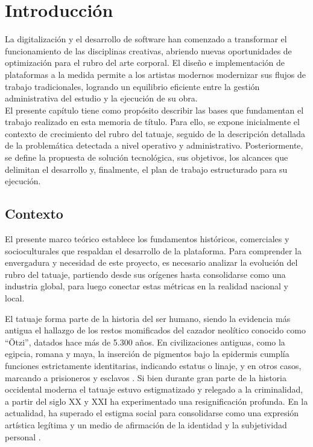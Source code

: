 \chapter{Introducción}

La digitalización y el desarrollo de software han comenzado a transformar el funcionamiento de las disciplinas creativas, abriendo nuevas oportunidades de optimización para el rubro del arte corporal. El diseño e implementación de plataformas a la medida permite a los artistas modernos modernizar sus flujos de trabajo tradicionales, logrando un equilibrio eficiente entre la gestión administrativa del estudio y la ejecución de su obra.\\
\indent El presente capítulo tiene como propósito describir las bases que fundamentan el trabajo realizado en esta memoria de título. Para ello, se expone inicialmente el contexto de crecimiento del rubro del tatuaje, seguido de la descripción detallada de la problemática detectada a nivel operativo y administrativo. Posteriormente, se define la propuesta de solución tecnológica, sus objetivos, los alcances que delimitan el desarrollo y, finalmente, el plan de trabajo estructurado para su ejecución.

\section{Contexto}

El presente marco teórico establece los fundamentos históricos, comerciales y socioculturales que respaldan el desarrollo de la plataforma. Para comprender la envergadura y necesidad de este proyecto, es necesario analizar la evolución del rubro del tatuaje, partiendo desde sus orígenes hasta consolidarse como una industria global, para luego conectar estas métricas en la realidad nacional y local.

El tatuaje forma parte de la historia del ser humano, siendo la evidencia más antigua el hallazgo de los restos momificados del cazador neolítico conocido como ``Ötzi'', datados hace más de 5.300 años. En civilizaciones antiguas, como la egipcia, romana y maya, la inserción de pigmentos bajo la epidermis cumplía funciones estrictamente identitarias, indicando estatus o linaje, y en otros casos, marcando a prisioneros y esclavos \cite{ballen2015}. Si bien durante gran parte de la historia occidental moderna el tatuaje estuvo estigmatizado y relegado a la criminalidad, a partir del siglo XX y XXI ha experimentado una resignificación profunda. En la actualidad, ha superado el estigma social para consolidarse como una expresión artística legítima y un medio de afirmación de la identidad y la subjetividad personal \cite{poulsen2021}.


